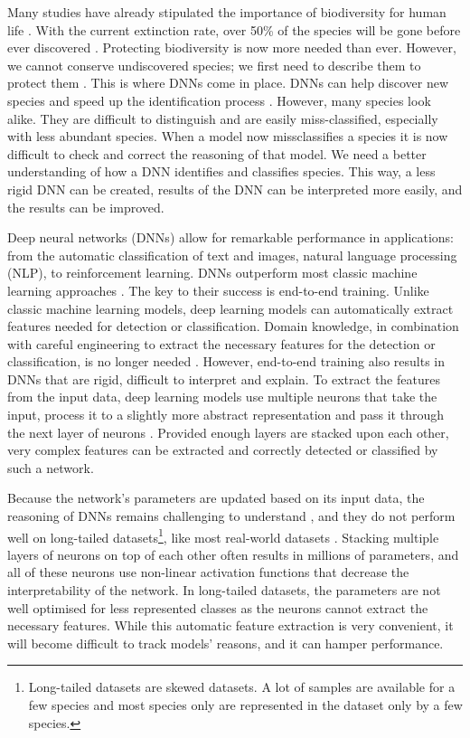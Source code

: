 \documentclass[a4paper, 12pt, oneside]{book} %
\begin{document}
Many studies have already stipulated the importance of biodiversity for human life \autocite{pimentel_economic_1997, gowdy_value_1997, raffaelli_links_2010, joppa_biodiversity_2011, pimm_how_2018}.
With the current extinction rate, over 50\% of the species will be gone before ever discovered \autocite{lees_species_2015}.
Protecting biodiversity is now more needed than ever.
However, we cannot conserve undiscovered species; we first need to describe them to protect them \autocite{joppa_biodiversity_2011}.
This is where DNNs come in place.
DNNs can help discover new species and speed up the identification process \autocite{van_horn_inaturalist_2018}.
However, many species look alike.
They are difficult to distinguish and are easily miss-classified, especially with less abundant species.
When a model now missclassifies a species it is now difficult to check and correct the reasoning of that model.
We need a better understanding of how a DNN identifies and classifies species. 
This way, a less rigid DNN can be created, results of the DNN can be interpreted more easily, and the results can be improved.

Deep neural networks (DNNs) allow for remarkable performance in applications: from the automatic classification of text and images, natural language processing (NLP), to reinforcement learning.
DNNs outperform most classic machine learning approaches \autocite{he_delving_2015, brown_language_2020}.
The key to their success is end-to-end training.
Unlike classic machine learning models, deep learning models can automatically extract features needed for detection or classification.
Domain knowledge, in combination with careful engineering to extract the necessary features for the detection or classification, is no longer needed \autocite{lecun_deep_2015}.
However, end-to-end training also results in DNNs that are rigid, difficult to interpret and explain.
To extract the features from the input data, deep learning models use multiple neurons that take the input, process it to a slightly more abstract representation and pass it through the next layer of neurons \autocite{schmidhuber_deep_2015}.
Provided enough layers are stacked upon each other, very complex features can be extracted and correctly detected or classified by such a network.

Because the network's parameters are updated based on its input data, the reasoning of DNNs remains challenging to understand \autocite{li_interpretable_2021, losch_interpretability_2019}, and they do not perform well on long-tailed datasets\footnote{Long-tailed datasets are skewed datasets. A lot of samples are available for a few species and most species only are represented in the dataset only by a few species.}, like most real-world datasets \autocite{van_horn_inaturalist_2018}.
Stacking multiple layers of neurons on top of each other often results in millions of parameters, and all of these neurons use non-linear activation functions that decrease the interpretability of the network.
In long-tailed datasets, the parameters are not well optimised for less represented classes as the neurons cannot extract the necessary features.
While this automatic feature extraction is very convenient, it will become difficult to track models' reasons, and it can hamper performance.
\end{document}

